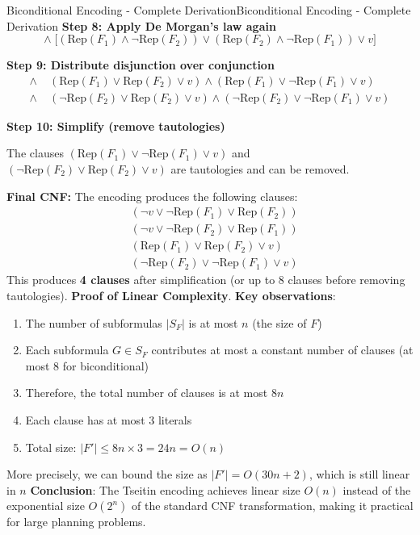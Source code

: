 \documentclass[a4paper]{article}
\newcommand{\Rep}{\mathrm{Rep}}
\theoremstyle{definition}
\begin{document}
\begin{example}{Biconditional Encoding - Complete Derivation}{Biconditional Encoding - Complete Derivation}
\noindent\textbf{Step 8: Apply De Morgan's law again}
\[
\land\; \big[(\Rep(F_1) \land \neg\Rep(F_2)) \lor (\Rep(F_2) \land \neg\Rep(F_1)) \lor v\big]
\]

\noindent\textbf{Step 9: Distribute disjunction over conjunction}
\begin{align*}
\land\;& (\Rep(F_1) \lor \Rep(F_2) \lor v) \land (\Rep(F_1) \lor \neg\Rep(F_1) \lor v) \\
\land\;& (\neg\Rep(F_2) \lor \Rep(F_2) \lor v) \land (\neg\Rep(F_2) \lor \neg\Rep(F_1) \lor v)
\end{align*}

\noindent\textbf{Step 10: Simplify (remove tautologies)}

\noindent The clauses $(\Rep(F_1) \lor \neg\Rep(F_1) \lor v)$ and $(\neg\Rep(F_2) \lor \Rep(F_2) \lor v)$ are tautologies and can be removed.

\bigskip
\noindent\textbf{Final CNF:} The encoding produces the following clauses:
\begin{align*}
& (\neg v \lor \neg\Rep(F_1) \lor \Rep(F_2)) \\
& (\neg v \lor \neg\Rep(F_2) \lor \Rep(F_1)) \\
& (\Rep(F_1) \lor \Rep(F_2) \lor v) \\
& (\neg\Rep(F_2) \lor \neg\Rep(F_1) \lor v)
\end{align*}
This produces \textbf{4 clauses} after simplification (or up to 8 clauses before removing tautologies).
\vspace{1em}
\noindent
\newline
\textbf{Proof of Linear Complexity}. \textbf{Key observations}:
\begin{enumerate}
    \item The number of subformulas \( |S_F| \) is at most \( n \) (the size of $F$)
    \item Each subformula \( G \in S_F \) contributes at most a constant number of clauses (at most 8 for biconditional)
    \item Therefore, the total number of clauses is at most \( 8n \)    
    \item Each clause has at most 3 literals 
    \item Total size: \( |F'| \leq 8n \times 3 = 24n = O(n) \)    
\end{enumerate}
More precisely, we can bound the size as \( |F'| = O(30n + 2) \), which is still linear in \( n \)     
\vspace{1em}
\noindent
\newline
\textbf{Conclusion}: The Tseitin encoding achieves linear size \( O(n) \) instead of the exponential size \( O(2^n) \) of the standard 
CNF transformation, making it practical for large planning problems.
\end{example}
\end{document}

